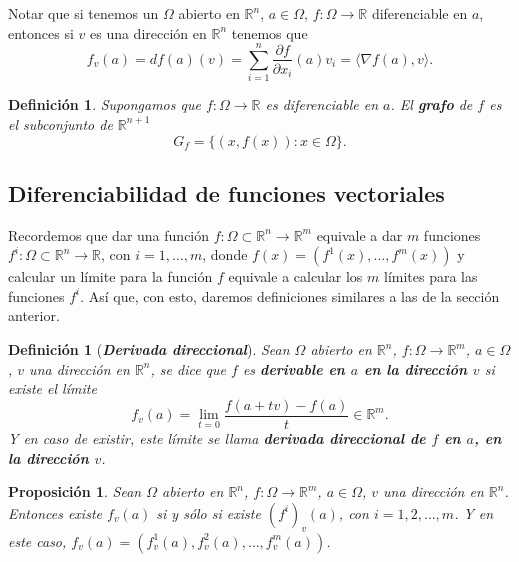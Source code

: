 \documentclass[12pt]{article}
\newtheorem{proposition}[theorem]{Proposición}
\newtheorem{definition}[theorem]{Definición}
\begin{document}
Notar que si tenemos un $\Omega$ abierto en $\mathbb{R}^n$, $a \in \Omega$, $f \colon \Omega \longrightarrow \mathbb{R}$ diferenciable en $a$, entonces si $v$ es una dirección en $\mathbb{R}^n$ tenemos que $$f_v(a) = df(a) (v) = \sum_{i=1}^n\dfrac{\partial f}{\partial x_i} (a) v_i = \langle\nabla f (a), v \rangle.$$

\begin{definition}Supongamos que $f \colon \Omega \longrightarrow \mathbb{R}$ es diferenciable en $a$. El \textbf{grafo} de $f$ es el subconjunto de $\mathbb{R}^{n+1}$ $$G_f = \lbrace (x, f(x)) : x \in \Omega \rbrace.$$
\end{definition}
\subsection{Diferenciabilidad de funciones vectoriales}

Recordemos que dar una función $f \colon \Omega \subset \mathbb{R}^n \longrightarrow \mathbb{R}^m$ equivale a dar $m$ funciones $f^i \colon \Omega \subset \mathbb{R}^n \longrightarrow \mathbb{R}$, con $i = 1, \ldots, m$, donde $f(x) = (f^1(x), \ldots, f^m(x))$ y calcular un límite para la función $f$ equivale a calcular los $m$ límites para las funciones $f^i$. Así que, con esto, daremos definiciones similares a las de la sección anterior.

\begin{definition}[\textbf{\textit{Derivada direccional}}] Sean $\Omega$ abierto en $\mathbb{R}^n$, $f \colon \Omega \longrightarrow \mathbb{R}^m$, $a \in \Omega$, $v$ una dirección en $\mathbb{R}^n$, se dice que $f$ es \textbf{derivable en $a$ en la dirección $v$} si existe el límite $$f_v(a) =\lim_{t=0} \dfrac{f(a+tv)-f(a)}{t} \in \mathbb{R}^m.$$ Y en caso de existir, este límite se llama \textbf{derivada direccional de $f$ en $a$, en la dirección $v$}.
\end{definition}

\begin{proposition}Sean $\Omega$ abierto en $\mathbb{R}^n$, $f\colon \Omega \longrightarrow \mathbb{R}^m$, $a \in \Omega$, $v$ una dirección en $\mathbb{R}^n$. Entonces existe $f_v(a)$ si y sólo si existe $(f^i)_v(a)$, con $i = 1, 2, \ldots, m$. Y en este caso, $f_v(a) = (f_v^1(a), f_v^2(a), \ldots, f_v^m(a))$.
\end{proposition}
\end{document}
